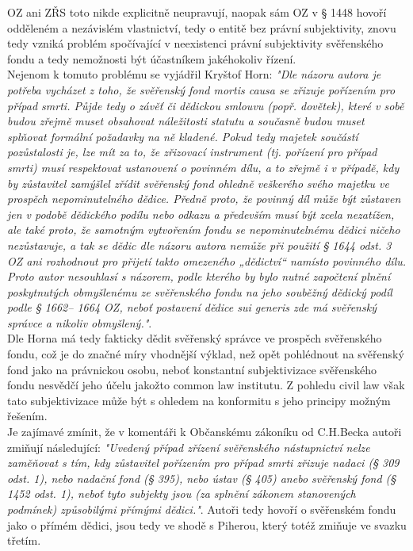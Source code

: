 \documentclass{article}
\begin{document}
 OZ ani ZŘS toto nikde explicitně neupravují, naopak sám OZ v § 1448 hovoří odděleném a nezávislém vlastnictví, tedy o entitě bez právní subjektivity, znovu tedy vzniká problém spočívající v neexistenci právní subjektivity svěřenského fondu a tedy nemožnosti být účastníkem jakéhokoliv řízení.\\
 
 Nejenom k tomuto problému se vyjádřil Kryštof Horn: \textit{"Dle názoru autora je potřeba vycházet z toho, že svěřenský fond mortis causa se zřizuje pořízením pro případ smrti. Půjde tedy o závěť či dědickou smlouvu (popř. dovětek), které v sobě budou zřejmě muset obsahovat náležitosti statutu a současně budou muset splňovat formální požadavky na ně kladené. Pokud tedy majetek součástí pozůstalosti je, lze mít za to, že zřizovací instrument (tj. pořízení pro případ smrti) musí respektovat ustanovení o povinném dílu, a to zřejmě i v případě, kdy by zůstavitel zamýšlel zřídit svěřenský fond ohledně veškerého svého majetku ve prospěch nepominutelného dědice. Předně proto, že povinný díl může být zůstaven jen v podobě dědického podílu nebo odkazu a především musí být zcela nezatížen, ale také proto, že samotným vytvořením fondu se nepominutelnému dědici ničeho nezůstavuje, a tak se dědic dle názoru autora nemůže při použití § 1644 odst. 3 OZ ani rozhodnout pro přijetí takto omezeného „dědictví“ namísto povinného dílu. Proto autor nesouhlasí s názorem, podle kterého by bylo nutné započtení plnění poskytnutých obmyšlenému ze svěřenského fondu na jeho souběžný dědický podíl podle § 1662– 1664 OZ, neboť postavení dědice sui generis zde má svěřenský správce a nikoliv obmyšlený."}.\\
 
 Dle Horna má tedy fakticky dědit svěřenský správce ve prospěch svěřenského fondu, což je do značné míry vhodnější výklad, než opět pohlédnout na svěřenský fond jako na právnickou osobu, neboť konstantní subjektivizace svěřenského fondu nesvědčí jeho účelu jakožto common law institutu. Z pohledu civil law však tato subjektivizace může být s ohledem na konformitu s jeho principy možným řešením.\\
 
 Je zajímavé zmínit, že v komentáři k Občanskému zákoníku od C.H.Becka autoři zmiňují následující: \textit{"Uvedený případ zřízení svěřenského nástupnictví nelze zaměňovat s tím, kdy zůstavitel pořízením pro případ smrti zřizuje nadaci (§ 309 odst. 1), nebo nadační fond (§ 395), nebo ústav (§ 405) anebo svěřenský fond (§ 1452 odst. 1), neboť tyto subjekty jsou (za splnění zákonem stanovených podmínek) způsobilými přímými dědici."}. Autoři tedy hovoří o svěřenském fondu jako o přímém dědici, jsou tedy ve shodě s Piherou, který totéž zmiňuje ve svazku třetím.\\
 
\end{document}
